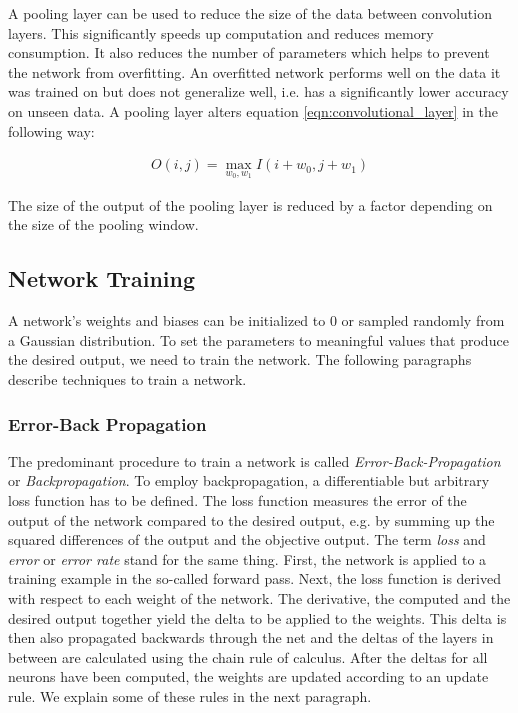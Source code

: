 A pooling layer can be used to reduce the size of the data between convolution layers. This significantly speeds up computation and reduces memory consumption. It also reduces the number of parameters which helps to prevent the network from overfitting. An overfitted network performs well on the data it was trained on but does not generalize well, i.e. has a significantly lower accuracy on unseen data. A pooling layer alters equation \ref{eqn:convolutional_layer} in the following way:

\begin{align}
O(i, j) = \max\limits_{w_0, w_1} I(i + w_0, j + w_1)
\end{align} 

The size of the output of the pooling layer is reduced by a factor depending on the size of the pooling window.

\subsection{Network Training} \label{section:network_training}

A network's weights and biases can be initialized to 0 or sampled randomly from a Gaussian distribution. To set the parameters to meaningful values that produce the desired output, we need to train the network. The following paragraphs describe techniques to train a network.

\subsubsection{Error-Back Propagation} The predominant procedure to train a network is called \textit{Error-Back-Propagation} or \textit{Backpropagation}. To employ backpropagation, a differentiable but arbitrary loss function has to be defined. The loss function measures the error of the output of the network compared to the desired output, e.g. by summing up the squared differences of the output and the objective output. The term \textit{loss} and \textit{error} or \textit{error rate} stand for the same thing. First, the network is applied to a training example in the so-called forward pass. Next, the loss function is derived with respect to each weight of the network. The derivative, the computed and the desired output together yield the delta to be applied to the weights. This delta is then also propagated backwards through the net and the deltas of the layers in between are calculated using the chain rule of calculus. After the deltas for all neurons have been computed, the weights are updated according to an update rule. We explain some of these rules in the next paragraph. 

